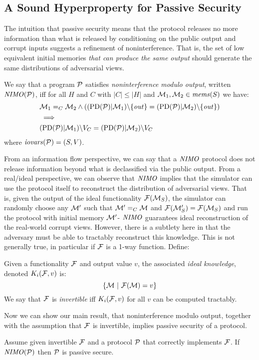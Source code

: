 \subsection{A Sound Hyperproperty for Passive Security}
\label{section-nimo}
The intuition that passive security means that the protocol releases
no more information than what is released by conditioning on the
public output and corrupt inputs suggests a
refinement of noninterference. That is, the set of low equivalent
initial memories \emph{that can produce the same output} should generate the
same distributions of adversarial views.
\begin{definition}
  We say that a program  $\mathcal{P}$ satisfies \emph{noninterference modulo output},
  written $\mathit{NIMO}(\mathcal{P})$, iff for all $H$ and $C$ with $|C|\le|H|$ and 
  $\mathcal{M}_1,\mathcal{M}_2 \in \mathit{mems}(S)$ we have:
  \begin{eqnarray*}
    & \mathcal{M}_1 =_C \mathcal{M}_2 \wedge
     ((\mathrm{PD}(\mathcal{P})|\mathcal{M}_1)\backslash\{ \mathit{out} \} =
     (\mathrm{PD}(\mathcal{P})|\mathcal{M}_2)\backslash\{ \mathit{out} \}) \\
    & \implies \\
    & (\mathrm{PD}(\mathcal{P})|\mathcal{M}_1)\backslash V_C =
    (\mathrm{PD}(\mathcal{P})|\mathcal{M}_2)\backslash V_C
  \end{eqnarray*}
where $\mathit{iovars}(\mathcal{P}) = (S,V)$.
\end{definition}

From an information flow perspective, we can say that a $\mathit{NIMO}$
protocol does not release information beyond what is declassified
via the public output. From a real/ideal perspective, we can
observe that $\mathit{NIMO}$ implies that the simulator can use
the protocol itself to reconstruct the distribution of adversarial
views. That is, given the output of the ideal functionality
$\mathcal{F}(\mathcal{M}_S)$, the simulator can randomly choose any
$\mathcal{M}'$ such that $\mathcal{M}' =_C \mathcal{M}$ and $\mathcal{F}(\mathcal{M}'_S) =
\mathcal{F}(\mathcal{M}_S)$ and run the protocol with initial memory $\mathcal{M}'$-
$\mathit{NIMO}$ guarantees ideal reconstruction of the real-world corrupt views. 
 However, there is a subtlety here in that the adversary
must be able to tractably reconstruct this knowledge. This is not
generally true, in particular if $\mathcal{F}$ is a 1-way
function. Define:
\begin{definition}
  Given a functionality $\mathcal{F}$ and output value $v$, the associated
  \emph{ideal knowledge}, denoted $K_i(\mathcal{F},v)$ is:
  $$
  \{ \mathcal{M}\ |\ \mathcal{F}(\mathcal{M}) = v \}
  $$
  We say that $\mathcal{F}$ is \emph{invertible} iff $K_i(\mathcal{F}, v)$ for all
  $v$ can be computed tractably.
\end{definition}
Now we can show our main result, that noninterference modulo output,
together with the assumption that $\mathcal{F}$ is invertible, implies
passive security of a protocol.
\begin{theorem}
  \label{theorem-nimo}
  Assume given invertible $\mathcal{F}$ and a protocol $\mathcal{P}$ that
  correctly implements $\mathcal{F}$.  If $\mathit{NIMO}(\mathcal{P})$
  then $\mathcal{P}$ is passive secure.
\end{theorem}

